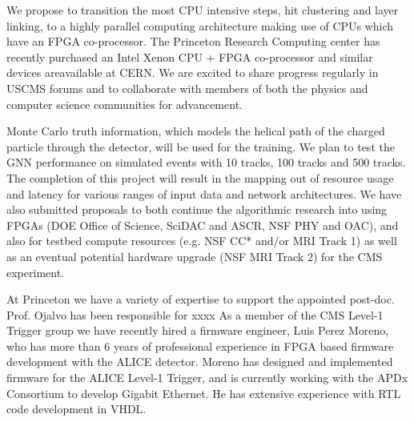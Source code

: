 \documentclass[preprint,12pt]{elsarticle}
\begin{document}
We propose to transition the most CPU intensive steps, hit clustering and layer linking,
to a highly parallel computing architecture making use of CPUs which have an FPGA co-processor.
The Princeton Research Computing center has recently purchased an Intel Xenon CPU + FPGA co-processor
and similar devices areavailable at CERN. We are excited to share progress regularly 
in USCMS forums and to collaborate with members of both the physics and computer science communities
for advancement. 

Monte Carlo truth information, which models the helical path of the charged particle through the detector,
will be used for the training. We plan to test the GNN performance on simulated events with 10 tracks,
100 tracks and 500 tracks. The completion of this project will result in the mapping out of resource
usage and latency for various ranges of input data and network architectures.
We have also submitted proposals to both continue the algorithmic
research into using FPGAs (DOE Office of Science, SciDAC and ASCR, NSF PHY and OAC), and also for testbed
compute resources (e.g. NSF CC* and/or MRI Track 1) as well as an eventual potential hardware upgrade
(NSF MRI Track 2) for the CMS experiment. %



At Princeton we have a variety of expertise to support the appointed post-doc.
Prof. Ojalvo has been responsible for xxxx
As a member of the CMS Level-1 Trigger group we have recently hired a firmware
engineer, Luis Perez Moreno, who has more than 6 years of professional experience in
FPGA based firmware development with the ALICE detector. 
Moreno has designed and implemented firmware for the ALICE
Level-1 Trigger, and is currently working with the APDx Consortium to develop Gigabit Ethernet. He has extensive experience with RTL code development in VHDL. 

\newpage


\end{document}
